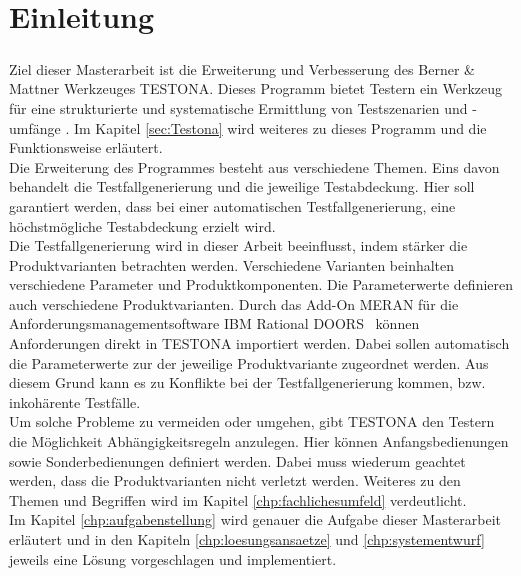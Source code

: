 \chapter{Einleitung}\label{chp:einleitung}
\paragraph{}
Ziel dieser Masterarbeit ist die Erweiterung und Verbesserung des Berner \& Mattner Werkzeuges TESTONA. Dieses Programm bietet Testern ein Werkzeug für eine strukturierte und systematische Ermittlung von Testszenarien und -umfänge \cite{TESTONA}. Im Kapitel \ref{sec:Testona} wird weiteres zu dieses Programm und die Funktionsweise erläutert.\\

Die Erweiterung des Programmes besteht aus verschiedene Themen. Eins davon behandelt die Testfallgenerierung und die jeweilige Testabdeckung. Hier soll garantiert werden, dass bei einer automatischen Testfallgenerierung, eine höchstmögliche Testabdeckung erzielt wird.\\

Die Testfallgenerierung wird in dieser Arbeit beeinflusst, indem stärker die Produktvarianten betrachten werden. Verschiedene Varianten beinhalten verschiedene Parameter und Produktkomponenten. Die Parameterwerte definieren auch verschiedene Produktvarianten. Durch das Add-On MERAN für die Anforderungsmanagementsoftware \glqq IBM Rational DOORS\grqq~ können Anforderungen direkt in  TESTONA importiert werden. Dabei sollen automatisch die Parameterwerte zur der jeweilige Produktvariante zugeordnet werden. Aus diesem Grund kann es zu Konflikte bei der Testfallgenerierung kommen, bzw. inkohärente Testfälle.\\

Um solche Probleme zu vermeiden oder umgehen, gibt TESTONA den Testern die Möglichkeit Abhängigkeitsregeln anzulegen. Hier können Anfangsbedienungen sowie Sonderbedienungen definiert werden. Dabei muss wiederum geachtet werden, dass die Produktvarianten nicht verletzt werden. Weiteres zu den Themen und Begriffen wird im Kapitel \ref{chp:fachlichesumfeld} verdeutlicht.\\

Im Kapitel \ref{chp:aufgabenstellung} wird genauer die Aufgabe dieser Masterarbeit erläutert und in den Kapiteln \ref{chp:loesungsansaetze} und \ref{chp:systementwurf} jeweils eine Lösung vorgeschlagen und implementiert.

